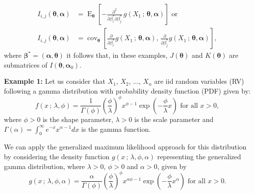 \documentclass[lineno]{biometrika}
\newcommand{\bs}{\boldsymbol}
\newcommand{\on}{\operatorname}
\begin{document}
 \begin{equation}\label{eqj}
 \begin{aligned}I_{i,j}(\bs{\theta},\bs{\alpha})&=
 \on{E}_{\bs{\theta}} \left[-\frac{\partial^2}{\partial \beta^*_i \partial\beta^*_j}\, g(X_1\, ;\, \bs{\theta},\bs{\alpha})\right]\mbox{ or}\\
 I_{i,j}(\bs{\theta},\bs{\alpha}) &=  \on{cov}_{\bs{\theta}} \left[\frac{\partial}{\partial \beta^*_i} g(X_1\, ;\, \bs{\theta}, \bs{\alpha}),\, \frac{\partial}{\partial \beta^*_j} g(X_1\, ;\, \bs{\theta},\bs{\alpha})\right],
 \end{aligned}
 \end{equation}
where $\bs{\beta}^*=(\bs{\alpha},\bs{\theta})$ it follows that, in these examples, $J(\bs{\theta})$ and $K(\bs{\theta})$ are submatrices of $I(\bs{\theta},\bs{\alpha}_0)$.

\noindent\textbf{Example 1:} Let us consider that $X_1$, $X_2$, $\ldots$, $X_n$   are iid random variables (RV) following a gamma distribution with probability density function (PDF) given by:
\begin{equation}\label{fdpgamma}
f(x\,;\,\lambda,\phi)=\frac{1}{\Gamma(\phi)}\left(\frac{\phi}{\lambda} \right)^{\phi} x^{\phi-1}\exp\left(-\frac{\phi}{\lambda} x \right)\mbox{ for all }x>0,
\end{equation}
where $\phi>0$ is the shape parameter,  $\lambda>0$ is the scale parameter and $\Gamma(\alpha)=\int_{0}^{\infty}{e^{-x}x^{\alpha-1}dx}$ is the  gamma function.

We can apply the generalized maximum likelihood approach for this distribution by considering the density function $g(x\,;\,\lambda,\phi,\alpha)$ representing the generalized gamma distribution,  where $\lambda>0$, $\phi>0$ and $\alpha>0$, given by
\begin{equation}\label{g}g(x\,;\,\lambda,\phi,\alpha)=\frac{\alpha}{\Gamma(\phi)}\left(\frac{\phi}{\lambda} \right)^\phi x^{\alpha\phi-1}\exp\left(-\frac{\phi}{\lambda} x^\alpha \right)\mbox{ for all }x>0.
\end{equation}
\end{document}

